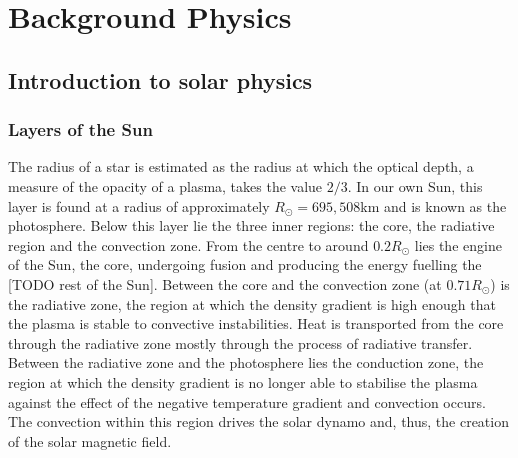 \chapter{Background Physics}

\graphicspath{{images/background/}}

\section{Introduction to solar physics}

\subsection{Layers of the Sun}

The radius of a star is estimated as the radius at which the optical depth, a measure of the opacity of a plasma, takes the value $2/3$. In our own Sun, this layer is found at a radius of approximately $R_{\odot} = 695,508$km and is known as the photosphere. Below this layer lie the three inner regions: the core, the radiative region and the convection zone. From the centre to around $0.2 R_{\odot}$ lies the engine of the Sun, the core, undergoing fusion and producing the energy fuelling the [TODO rest of the Sun]. Between the core and the convection zone (at $0.71R_{\odot}$) is the radiative zone, the region at which the density gradient is high enough that the plasma is stable to convective instabilities. Heat is transported from the core through the radiative zone mostly through the process of radiative transfer. Between the radiative zone and the photosphere lies the conduction zone, the region at which the density gradient is no longer able to stabilise the plasma against the effect of the negative temperature gradient and convection occurs. The convection within this region drives the solar dynamo and, thus, the creation of the solar magnetic field.

